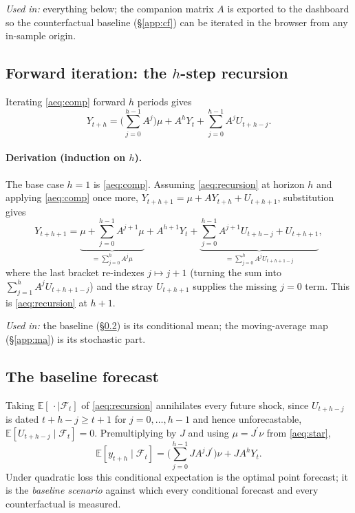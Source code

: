 \documentclass[11pt]{article}
\newcommand{\E}{\mathbb{E}}
\newcommand{\Fset}{\mathcal{F}}
\newcommand{\tp}{^{\prime}}
\theoremstyle{remark}
\begin{document}
\medskip
\noindent\textit{Used in:} everything below; the companion matrix $A$ is exported
to the dashboard so the counterfactual baseline (\S\ref{app:cf}) can be iterated
in the browser from any in-sample origin.

\subsection{Forward iteration: the \texorpdfstring{$h$}{h}-step recursion}\label{app:recursion}
Iterating \eqref{aeq:comp} forward $h$ periods gives
\begin{equation}
Y_{t+h}=\Bigg(\sum_{j=0}^{h-1}A^{j}\Bigg)\mu+A^{h}Y_t+\sum_{j=0}^{h-1}A^{j}U_{t+h-j}.
\tag{3}\label{aeq:recursion}
\end{equation}

\paragraph{Derivation (induction on $h$).} The base case $h=1$ is
\eqref{aeq:comp}. Assuming \eqref{aeq:recursion} at horizon $h$ and applying
\eqref{aeq:comp} once more, $Y_{t+h+1}=\mu+AY_{t+h}+U_{t+h+1}$, substitution gives
\[
Y_{t+h+1}
=\underbrace{\mu+\sum_{j=0}^{h-1}A^{j+1}\mu}_{=\sum_{j=0}^{h}A^{j}\mu}
+A^{h+1}Y_t
+\underbrace{\sum_{j=0}^{h-1}A^{j+1}U_{t+h-j}+U_{t+h+1}}_{=\sum_{j=0}^{h}A^{j}U_{t+h+1-j}},
\]
where the last bracket re-indexes $j\mapsto j+1$ (turning the sum into
$\sum_{j=1}^{h}A^{j}U_{t+h+1-j}$) and the stray $U_{t+h+1}$ supplies the missing
$j=0$ term. This is \eqref{aeq:recursion} at $h+1$.

\medskip
\noindent\textit{Used in:} the baseline (\S\ref{app:base}) is its conditional
mean; the moving-average map (\S\ref{app:ma}) is its stochastic part.

\subsection{The baseline forecast}\label{app:base}
Taking $\E[\,\cdot\mid\Fset_t]$ of \eqref{aeq:recursion} annihilates every future
shock, since $U_{t+h-j}$ is dated $t+h-j\ge t+1$ for $j=0,\dots,h-1$ and hence
unforecastable, $\E[U_{t+h-j}\mid\Fset_t]=0$. Premultiplying by $J$ and using
$\mu=J\tp\nu$ from \eqref{aeq:star},
\begin{equation}
\E[y_{t+h}\mid\Fset_t]
=\Bigg(\sum_{j=0}^{h-1}JA^{j}J\tp\Bigg)\nu+JA^{h}Y_t.
\tag{4}\label{aeq:base}
\end{equation}
Under quadratic loss this conditional expectation is the optimal point forecast;
it is the \emph{baseline scenario} against which every conditional forecast and
every counterfactual is measured.
\end{document}
